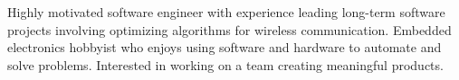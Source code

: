 

\begin{cvparagraph}

Highly motivated software engineer with experience leading long-term software projects involving optimizing algorithms for wireless communication.  Embedded electronics hobbyist who enjoys using software and hardware to automate and solve problems.  Interested in working on a team creating meaningful products.
\end{cvparagraph}
